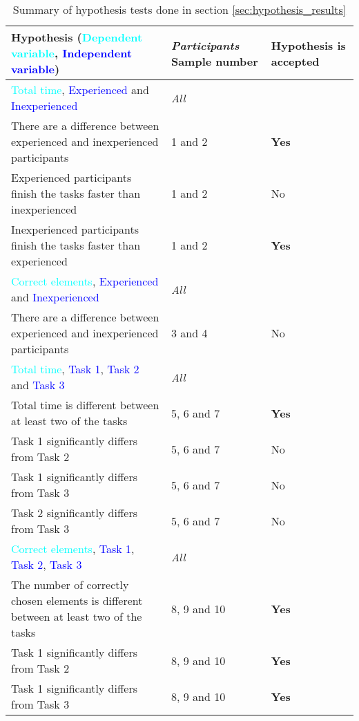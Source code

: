 	\begin{longtable}{p{}|p{}|p{}}  %
	\caption[Summary, normality tests]{Summary of hypothesis tests done in section \ref{sec:hypothesis_results}} \label{tab:hypothesistest_summary} \\
		Hypothesis (\textcolor{cyan}{Dependent variable}, \textcolor{blue}{Independent variable}) & \textit{Participants} Sample number& Hypothesis is accepted \\[0.2cm] \hline
		\textcolor{cyan}{Total time}, \textcolor{blue}{Experienced} and \textcolor{blue}{Inexperienced} & \textit{All} &  \\
		There are a difference between experienced and inexperienced participants & 1 and 2 & \textbf{Yes} \\
		Experienced participants finish the tasks faster than inexperienced  & 1 and 2 & No   \\ 
		Inexperienced participants finish the tasks faster than experienced  & 1 and 2 & \textbf{Yes}   \\ \hline
		\textcolor{cyan}{Correct elements}, \textcolor{blue}{Experienced} and \textcolor{blue}{Inexperienced} & \textit{All} &  \\
		There are a difference between experienced and inexperienced participants & 3 and 4 & No   \\ \hline
		\textcolor{cyan}{Total time}, \textcolor{blue}{Task 1}, \textcolor{blue}{Task 2} and \textcolor{blue}{Task 3}& \textit{All} &  \\
		 Total time is different between at least two of the tasks & 5, 6 and 7 & \textbf{Yes}   \\
		 Task 1 significantly differs from Task 2 & 5, 6 and 7 & No  \\ 
		 Task 1 significantly differs from Task 3 & 5, 6 and 7 & No  \\ 
		 Task 2 significantly differs from Task 3 & 5, 6 and 7 & No  \\ \hline
		\textcolor{cyan}{Correct elements}, \textcolor{blue}{Task 1}, \textcolor{blue}{Task 2}, \textcolor{blue}{Task 3} & \textit{All} &  \\
		The number of correctly chosen elements is different between at least two of the tasks & 8, 9 and 10 & \textbf{Yes}  \\
		Task 1 significantly differs from Task 2 & 8, 9 and 10 & \textbf{Yes}  \\ 
		Task 1 significantly differs from Task 3 & 8, 9 and 10 & \textbf{Yes}  \\ 

\end{longtable}
